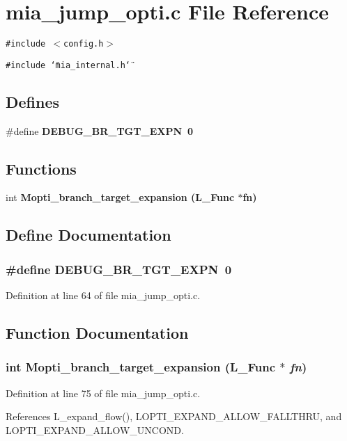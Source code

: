 \section{mia\_\-jump\_\-opti.c File Reference}
\label{mia__jump__opti_8c}
{\tt \#include $<$config.h$>$}\par
{\tt \#include \char`\"{}mia\_\-internal.h\char`\"{}}\par
\subsection*{Defines}
\begin{CompactItemize}
\item 
\#define \bf{DEBUG\_\-BR\_\-TGT\_\-EXPN}~0
\end{CompactItemize}
\subsection*{Functions}
\begin{CompactItemize}
\item 
int \bf{Mopti\_\-branch\_\-target\_\-expansion} (L\_\-Func $\ast$fn)
\end{CompactItemize}


\subsection{Define Documentation}
\subsubsection{\setlength{\rightskip}{0pt plus 5cm}\#define DEBUG\_\-BR\_\-TGT\_\-EXPN~0}\label{mia__jump__opti_8c_c9255186c3fa5c0fbde7edd6712e1cd9}




Definition at line 64 of file mia\_\-jump\_\-opti.c.

\subsection{Function Documentation}
\subsubsection{\setlength{\rightskip}{0pt plus 5cm}int Mopti\_\-branch\_\-target\_\-expansion (L\_\-Func $\ast$ {\em fn})}\label{mia__jump__opti_8c_ecc2271fa0113f92de8fd859a24e2e26}




Definition at line 75 of file mia\_\-jump\_\-opti.c.

References L\_\-expand\_\-flow(), LOPTI\_\-EXPAND\_\-ALLOW\_\-FALLTHRU, and LOPTI\_\-EXPAND\_\-ALLOW\_\-UNCOND.
